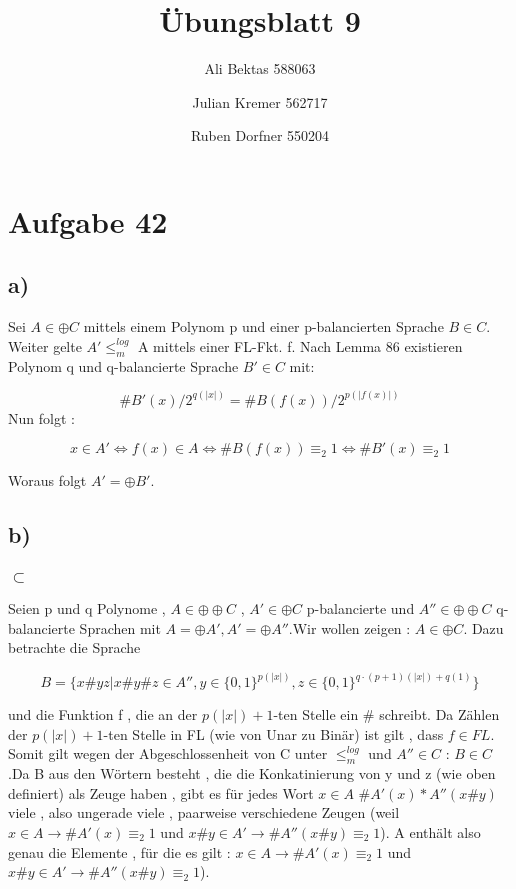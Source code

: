 \documentclass{article}
\title{Übungsblatt 9}
\author{Ali Bektas 588063 \and Julian Kremer 562717 \and Ruben Dorfner 550204}
\begin{document}
	\maketitle
	
	\section*{Aufgabe 42}

	\subsection*{a)}
		Sei $A\in \oplus C$ mittels einem Polynom p und einer p-balancierten Sprache $B \in C$. Weiter gelte $A' \leq^{log}_m$ A mittels einer FL-Fkt. f. Nach Lemma 86 existieren Polynom q und q-balancierte Sprache $B'\in C$ mit:

		\[
			\#B'(x)/2^{q(|x|)} = \#B(f(x))/2^{p(|f(x)|)}
		\]
		Nun folgt :

		\[
			x \in A' \iff f(x) \in A \iff \#B(f(x)) \equiv_2 1 \iff \#B'(x) \equiv_2 1
		\]

		Woraus folgt $A' = \oplus B'$.
	\subsection*{b)}
		\subsubsection*{$\subset$}
			Seien p und q Polynome , $A \in \oplus \oplus C$ , $A' \in \oplus C$ p-balancierte und $A'' \in \oplus \oplus C$ q-balancierte Sprachen mit 
			$A = \oplus A'  , A' = \oplus A''$.Wir wollen zeigen : $A \in \oplus C$. Dazu betrachte die  Sprache 
			
			\[
			B= \{ x\#yz| x\#y\#z \in A'' ,  y \in \{0,1\}^{p(|x|)} , z \in \{0,1\}^{q\cdot (p+1)(|x|) + q(1)} \}
			\] 

			und die Funktion f , die an der $p(|x|)+1$-ten Stelle ein \# schreibt. Da Zählen der $p(|x|)+1$-ten Stelle in FL (wie von Unar zu Binär) ist gilt , dass $f \in FL$. Somit gilt wegen der Abgeschlossenheit von C unter $\leq^{log}_m$ und $A'' \in C$ : $B \in C$.Da B aus den Wörtern besteht , die die Konkatinierung von y und z (wie oben definiert) als Zeuge haben , gibt es für jedes Wort $x \in A$  $\#A'(x) * A''(x\#y)$ viele , also ungerade viele , paarweise verschiedene Zeugen (weil $x \in A \rightarrow \#A'(x) \equiv_2 1 $ und $x\#y \in A' \rightarrow \#A''(x\#y)\equiv_2 1$). A enthält also genau die Elemente , für die es gilt : $x \in A \rightarrow \#A'(x) \equiv_2 1 $ und $x\#y \in A' \rightarrow \#A''(x\#y)\equiv_2 1$). 
\end{document}
